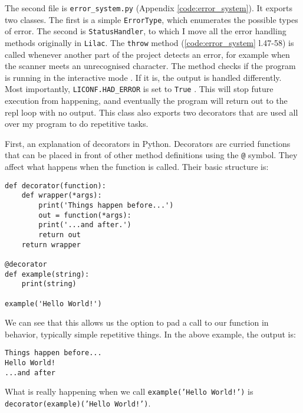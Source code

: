\documentclass[a4paper, 11pt]{report}
\begin{document}
{{The second file is \verb|error_system.py| (Appendix \ref{code:error_system}). It exports two classes. The first is a simple \verb|ErrorType|, which enumerates the possible types of error. The second is \verb|StatusHandler|, to which I move all the error handling methods originally in \verb|Lilac|. The \verb|throw| method (\ref{code:error_system} l.47-58) is called whenever another part of the project detects an error, for example when the scanner meets an unrecognised character. The method checks if the program is running in the interactive mode . If it is, the output is handled differently. Most importantly, \verb|LICONF.HAD_ERROR| is set to \verb|True| . This will stop future execution from happening, aand eventually the program will return out to the repl loop with no output. This class also exports two decorators that are used all over my program to do repetitive tasks.

First, an explanation of decorators in Python. Decorators are curried functions that can be placed in front of other method definitions using the \verb|@| symbol. They affect what happens when the function is called. Their basic structure is:

\begin{verbatim}
def decorator(function):
    def wrapper(*args):
        print('Things happen before...')
        out = function(*args):
        print('...and after.')
        return out
    return wrapper

@decorator	
def example(string):
    print(string)
	
example('Hello World!')
\end{verbatim}

We can see that this allows us the option to pad a call to our function in behavior, typically simple repetitive things. In the above example, the output is:

\begin{verbatim}
Things happen before...
Hello World!
...and after
\end{verbatim}

What is really happening when we call \texttt{example('Hello World!')} is \texttt{decorator(example)('Hello World!')}.\\

}}
\end{document}
